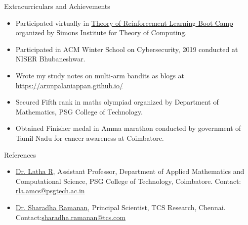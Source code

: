 \documentclass{resume} %
\begin{document}
\begin{rSection}{Extracurriculars and Achievements}
\vspace*{0.1in}
\begin{itemize}[leftmargin=*]
\item Participated virtually in \href{https://simons.berkeley.edu/workshops/rl-2020-bc}{Theory of Reinforcement Learning Boot Camp} organized by Simons Institute for Theory of Computing.
\item Participated in ACM Winter School on Cybersecurity, 2019 conducted at NISER Bhubaneshwar.
\item Wrote my study notes on multi-arm bandits as blogs at \href{https://arunpalaniappan.github.io/}{https://arunpalaniappan.github.io/}
\item Secured Fifth rank in maths olympiad organized by Department of Mathematics, PSG College of Technology.
\item Obtained Finisher medal in Amma marathon conducted by government of Tamil Nadu for cancer awareness at Coimbatore.
\end{itemize}
\end{rSection}

\begin{rSection}{References}
\begin{itemize}[leftmargin=*]
\item \href{https://www.psgtech.edu/facgen.php?id=C3150}{Dr. Latha R}, Assistant Professor,  Department of Applied Mathematics and Computational Science, PSG College of Technology, Coimbatore. Contact: \href{mailto:rla.amcs@psgtech.ac.in}{rla.amcs@psgtech.ac.in}
\item \href{https://www.linkedin.com/in/sharadha-ramanan-43bb4946/}{Dr. Sharadha Ramanan}, Principal Scientist, TCS Research, Chennai. Contact:\href{mailto:sharadha.ramanan@tcs.com}{sharadha.ramanan@tcs.com}
\end{itemize}
\end{rSection}

\end{document}
